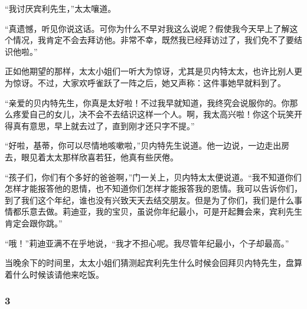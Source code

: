 \par “我讨厌宾利先生，”太太嚷道。
\par “真遗憾，听见你说这话。可你为什么不早对我这么说呢？假使我今天早上了解这个情况，我肯定不会去拜访他。非常不幸，既然我已经拜访过了，我们免不了要结识他啦。”
\par 正如他期望的那样，太太小姐们一听大为惊讶，尤其是贝内特太太，也许比别人更为惊讶。不过，大家欢呼雀跃了一阵之后，她又声称：这件事她早就料到了。
\par “亲爱的贝内特先生，你真是太好啦！不过我早就知道，我终究会说服你的。你那么疼爱自己的女儿，决不会不去结识这样一个人。啊，我太高兴啦！你这个玩笑开得真有意思，早上就去过了，直到刚才还只字不提。”
\par “好啦，基蒂，你可以尽情地咳嗽啦，”贝内特先生说道。他一边说，一边走出房去，眼见着太太那样欣喜若狂，他真有些厌倦。
\par “孩子们，你们有个多好的爸爸啊，”门一关上，贝内特太太便说道。“我不知道你们怎样才能报答他的恩情，也不知道你们怎样才能报答我的恩情。我可以告诉你们，到了我们这个年纪，谁也没有兴致天天去结交朋友。但是为了你们，我们是什么事情都乐意去做。莉迪亚，我的宝贝，虽说你年纪最小，可是开起舞会来，宾利先生肯定会跟你跳。”
\par “哦！”莉迪亚满不在乎地说，“我才不担心呢。我尽管年纪最小，个子却最高。”
\par 当晚余下的时间里，太太小姐们猜测起宾利先生什么时候会回拜贝内特先生，盘算着什么时候该请他来吃饭。



\subsubsection*{3}

